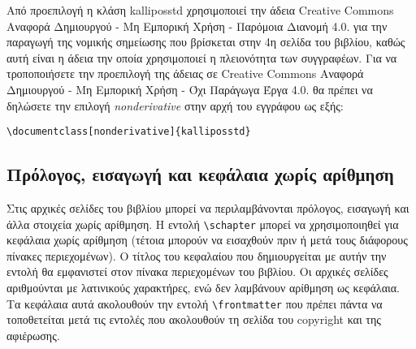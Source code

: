 \begin{refsection}
Από προεπιλογή η κλάση kalliposstd χρησιμοποιεί την άδεια Creative Commons Αναφορά Δημιουργού -
Μη Εμπορική Χρήση - Παρόμοια Διανομή 4.0. για την παραγωγή της νομικής σημείωσης που βρίσκεται
στην 4η σελίδα
του βιβλίου, καθώς αυτή είναι η άδεια την οποία χρησιμοποιεί η πλειονότητα των συγγραφέων. Για
να τροποποιήσετε την προεπιλογή της άδειας σε Creative Commons Αναφορά Δημιουργού - Μη Εμπορική
Χρήση - Όχι Παράγωγα Έργα 4.0. θα πρέπει να δηλώσετε την επιλογή \emph{nonderivative} στην αρχή
του εγγράφου ως εξής:
\begin{center}
 \verb|\documentclass[nonderivative]{kalliposstd}|
\end{center}

\subsection{Πρόλογος, εισαγωγή και κεφάλαια χωρίς αρίθμηση}
Στις αρχικές σελίδες του βιβλίου μπορεί να περιλαμβάνονται πρόλογος, εισαγωγή και άλλα στοιχεία
 χωρίς αρίθμηση. Η εντολή \verb|\schapter| μπορεί να χρησιμοποιηθεί για κεφάλαια χωρίς αρίθμηση
 (τέτοια μπορούν να εισαχθούν πριν ή μετά τους διάφορους πίνακες περιεχομένων). O τίτλος του
 κεφαλαίου που δημιουργείται με αυτήν την εντολή θα εμφανιστεί στον πίνακα περιεχομένων του
 βιβλίου. Οι αρχικές σελίδες αριθμούνται με λατινικούς χαρακτήρες, ενώ δεν λαμβάνουν αρίθμηση ως
 κεφάλαια. Τα κεφάλαια αυτά ακολουθούν την εντολή \verb|\frontmatter| που πρέπει πάντα να
 τοποθετείται μετά τις εντολές που ακολουθούν τη σελίδα του copyright και της αφιέρωσης.


\end{refsection}
